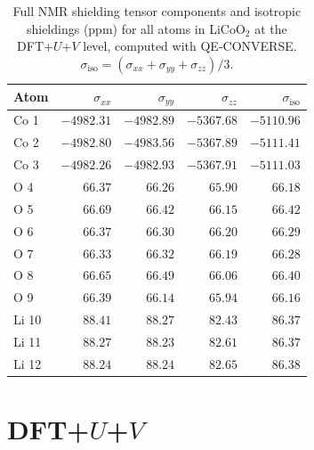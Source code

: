 \documentclass[11pt]{article}
\begin{document}
\begin{table}[h]
\centering
\caption{Full NMR shielding tensor components and isotropic shieldings (ppm) for all atoms in LiCoO$_2$ at the DFT+$U$+$V$ level, computed with QE-CONVERSE. $\sigma_\text{iso} = (\sigma_{xx}+\sigma_{yy}+\sigma_{zz})/3$.}
\label{tab:licoo2_dftu_shielding_full}
\begin{tabular}{lrrrr}
\hline
Atom & $\sigma_{xx}$ & $\sigma_{yy}$ & $\sigma_{zz}$ & $\sigma_\text{iso}$ \\
\hline
Co 1 & $-4982.31$ & $-4982.89$ & $-5367.68$ & $-5110.96$ \\
Co 2 & $-4982.80$ & $-4983.56$ & $-5367.89$ & $-5111.41$ \\
Co 3 & $-4982.26$ & $-4982.93$ & $-5367.91$ & $-5111.03$ \\
\hline
O 4  & $66.37$    & $66.26$    & $65.90$    & $66.18$    \\
O 5  & $66.69$    & $66.42$    & $66.15$    & $66.42$    \\
O 6  & $66.37$    & $66.30$    & $66.20$    & $66.29$    \\
O 7  & $66.33$    & $66.32$    & $66.19$    & $66.28$    \\
O 8  & $66.65$    & $66.49$    & $66.06$    & $66.40$    \\
O 9  & $66.39$    & $66.14$    & $65.94$    & $66.16$    \\
\hline
Li 10 & $88.41$   & $88.27$    & $82.43$    & $86.37$    \\
Li 11 & $88.27$   & $88.23$    & $82.61$    & $86.37$    \\
Li 12 & $88.24$   & $88.24$    & $82.65$    & $86.38$    \\
\hline
\end{tabular}
\end{table}

\newpage
\clearpage

\section{DFT+$U$+$V$}
\end{document}
